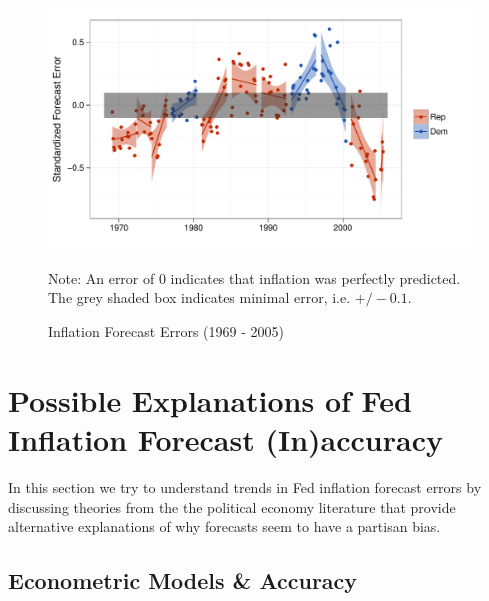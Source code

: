 \documentclass[a4paper]{article}\usepackage{graphicx, color}
\newenvironment{knitrout}{}{} %
\begin{document}
\begin{figure}[t]
    \caption{Inflation Forecast Errors (1969 - 2005)}
    \label{errors_over_time}
    \begin{center}
    
\begin{knitrout}
\color{fgcolor}\includegraphics[width=0.8\linewidth]{figure/PartisanError} 
\end{knitrout}

    
    \end{center}
    \begin{singlespace}
        {\scriptsize{Note: An error of 0 indicates that inflation was perfectly predicted. \\
            The grey shaded box indicates minimal error, i.e. $+/- 0.1$.
        }}
    \end{singlespace}
\end{figure}


\section{Possible Explanations of Fed Inflation Forecast (In)accuracy}

In this section we try to understand trends in Fed inflation forecast errors by discussing theories from the the political economy literature that provide alternative explanations of why forecasts seem to have a partisan bias. 

\subsection{Econometric Models \& Accuracy}
\end{document}

